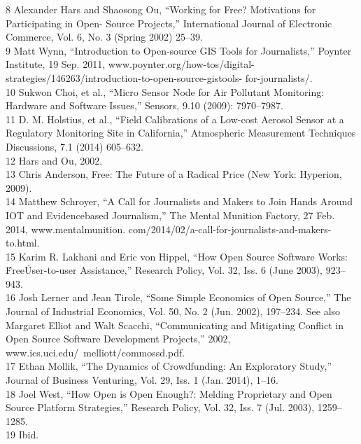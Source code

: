 \begin{itemize}
\begin{itemized}
\begin{itemize}
8 Alexander Hars and Shaosong Ou, ``Working for Free? Motivations for Participating in Open-
Source Projects,'' International Journal of Electronic Commerce, Vol. 6, No. 3 (Spring 2002) 25–39.\\
9 Matt Wynn, ``Introduction to Open-source GIS Tools for Journalists,'' Poynter Institute, 19 Sep.
2011, www.poynter.org/how-tos/digital-strategies/146263/introduction-to-open-source-gistools-
for-journalists/.\\
10 Sukwon Choi, et al., ``Micro Sensor Node for Air Pollutant Monitoring: Hardware and Software
Issues,'' Sensors, 9.10 (2009): 7970–7987.\\
11 D. M. Holstius, et al., ``Field Calibrations of a Low-cost Aerosol Sensor at a Regulatory Monitoring
Site in California,'' Atmospheric Measurement Techniques Discussions, 7.1 (2014) 605–632.\\
12 Hars and Ou, 2002.\\
13 Chris Anderson, Free: The Future of a Radical Price (New York: Hyperion, 2009).\\
14 Matthew Schroyer, ``A Call for Journalists and Makers to Join Hands Around IOT and Evidencebased
Journalism,'' The Mental Munition Factory, 27 Feb. 2014, www.mentalmunition.
com/2014/02/a-call-for-journalists-and-makers-to.html.\\
15 Karim R. Lakhani and Eric von Hippel, ``How Open Source Software Works: \'Free\' User-to-user
Assistance,'' Research Policy, Vol. 32, Iss. 6 (June 2003), 923–943.\\
16 Josh Lerner and Jean Tirole, ``Some Simple Economics of Open Source,'' The Journal of Industrial
Economics, Vol. 50, No. 2 (Jun. 2002), 197–234. See also Margaret Elliot and Walt Scacchi,
``Communicating and Mitigating Conflict in Open Source Software Development Projects,'' 2002,
www.ics.uci.edu/~melliott/commossd.pdf.\\
17 Ethan Mollik, ``The Dynamics of Crowdfunding: An Exploratory Study,'' Journal of Business
Venturing, Vol. 29, Iss. 1 (Jan. 2014), 1–16.\\
18 Joel West, ``How Open is Open Enough?: Melding Proprietary and Open Source Platform
Strategies,'' Research Policy, Vol. 32, Iss. 7 (Jul. 2003), 1259–1285.\\
19 Ibid.\\


\end{itemize}
\end{itemized}
\end{itemize}
